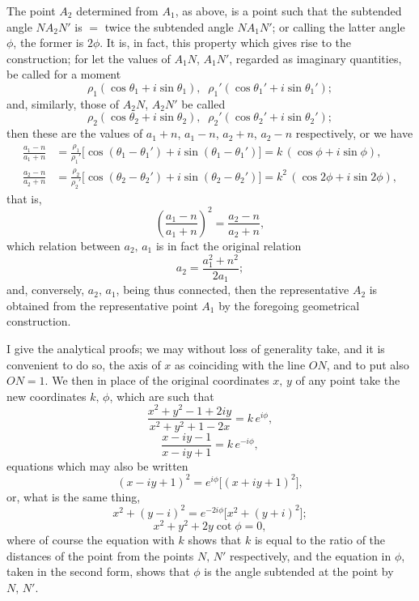 \documentclass[11pt]{article}
\begin{document}
The point $A_2$ determined from $A_1$, as above, is a point such that the subtended
angle $NA_2 N'$ is $=$ twice the subtended angle $NA_1 N'$; or calling the latter angle $\phi$,
the former is $2\phi$. It is, in fact, this property which gives rise to the construction;
for let the values of $A_1 N$, $A_1 N'$, regarded as imaginary quantities, be called for a
moment
\[
   \rho_1(\cos\theta_1 + i\sin\theta_1),\;\;\rho_1'(\cos\theta_1' + i\sin\theta_1');
\]
and, similarly, those of $A_2 N$, $A_2 N'$ be called
\[
   \rho_2(\cos\theta_2 + i\sin\theta_2),\;\;\rho_2'(\cos\theta_2' + i\sin\theta_2');
\]
then these are the values of $a_1 + n$, $a_1 - n$, $a_2 + n$, $a_2 - n$ respectively, or we have
\begin{align*}
\frac{a_1 - n}{a_1 + n} &= \frac{\rho_1}{\rho_1'}\bigl[\cos(\theta_1 - \theta_1') + i\sin(\theta_1 - \theta_1')\bigr] = k\,(\cos\phi + i\sin\phi),\\
\frac{a_2 - n}{a_2 + n} &= \frac{\rho_2}{\rho_2'}\bigl[\cos(\theta_2 - \theta_2') + i\sin(\theta_2 - \theta_2')\bigr] = k^2\,(\cos 2\phi + i\sin 2\phi),
\end{align*}
that is,
\[
   \left(\frac{a_1 - n}{a_1 + n}\right)^{\!2} = \frac{a_2 - n}{a_2 + n},
\]
which relation between $a_2,\,a_1$ is in fact the original relation
\[
   a_2 = \frac{a_1^2 + n^2}{2 a_1};
\]
and, conversely, $a_2,\,a_1$, being thus connected, then the representative $A_2$ is obtained
from the representative point $A_1$ by the foregoing geometrical construction.

\bigskip

I give the analytical proofs; we may without loss of generality take, and it is
convenient to do so, the axis of $x$ as coinciding with the line $ON$, and to put also
$ON = 1$. We then in place of the original coordinates $x,\,y$ of any point take the
new coordinates $k,\,\phi$, which are such that
\[
   \frac{x^2 + y^2 - 1 + 2iy}{x^2 + y^2 + 1 - 2x} = k\,e^{i\phi},
\]
\[
   \frac{x - iy - 1}{x - iy + 1} = k\,e^{-i\phi},
\]
equations which may also be written
\[
   (x - iy + 1)^2 = e^{i\phi}\bigl[(x + iy + 1)^2\bigr],
\]
or, what is the same thing,
\[
   x^2 + (y - i)^2 = e^{-2i\phi}\bigl[x^2 + (y + i)^2\bigr];
\]
\[
   x^2 + y^2 + 2y\cot\phi = 0,
\]
where of course the equation with $k$ shows that $k$ is equal to the ratio of the
distances of the point from the points $N,\,N'$ respectively, and the equation in $\phi$,
taken in the second form, shows that $\phi$ is the angle subtended at the point by $N,\,N'$.
\end{document}
